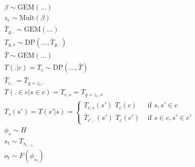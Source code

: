 \documentclass[11pt]{article}
\begin{document}
\begin{align*}
\beta \sim \text{GEM}(...) \\
z_c \sim \text{Mult}(\beta) \\
\bar{T}_{g,\cdot} \sim \text{GEM}(...) \\
T_{g,s} \sim \text{DP}(..., \bar{T}_{g,\cdot}) \\
\bar{T} \sim \text{GEM}(...) \\
T(.|c) = T_c \sim \text{DP}(..., \bar{T}) \\
\bar{T}_{c,\cdot} = \bar{T}_{g=z_c,\cdot} \\
T(. \in c | s \in c) = T_{c,s} = T_{g=z_c,s}\\
T_s(s') = T(s'|s) = \begin{cases}  T_{c,s}(s') \,\, T_c(c) & \text{ if } s, s' \in c \\  \bar{T}_{c',\cdot}(s') \,\, T_c(c') & \text{ if } s \in c, s' \in c'  \end{cases} \\
\phi_s \sim H \\
s_t \sim T_{s_{t-1}} \\
o_t \sim F(\phi_{s_t})
\end{align*}



\renewcommand{\refname}{Bibliography \& References Cited}

\end{document}
